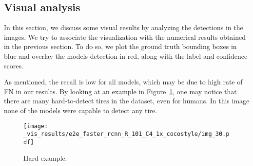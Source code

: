 


\newpage
\subsection{Visual analysis}\label{sec:res_vis}
%
In this section, we discuss some visual results by analyzing the detections in the images.
We try to associate the visualization with the numerical results obtained in the previous section.
To do so, we plot the ground truth bounding boxes in blue and overlay the models detection in red, along with the label and confidence scores.

As mentioned, the recall is low for all models, which may be due to high rate of FN in our results.
By looking at an example in Figure~\ref{fig:hard}, one may notice that there are many hard-to-detect tires in the dataset, even for humans.
In this image none of the models were capable to detect any tire.
%
\begin{figure}[h!]
	\centering
	\texttt{[image: \_vis\_results/e2e\_faster\_rcnn\_R\_101\_C4\_1x\_cocostyle/img\_30.pdf]}
	\caption{Hard example.}
	\label{fig:hard}
\end{figure}


